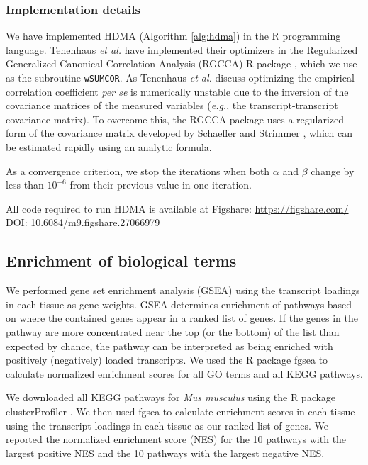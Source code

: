 \documentclass[
]{article}
\begin{document}
\subsubsection{Implementation details}\label{implementation-details}

We have implemented HDMA (Algorithm \ref{alg:hdma}) in the R programming
language. Tenenhaus \textit{et al.} have implemented their optimizers in
the Regularized Generalized Canonical Correlation Analysis (RGCCA) R
package \cite{girka2023multiblock}, which we use as the subroutine
\texttt{wSUMCOR}. As Tenenhaus \textit{et al.} discuss optimizing the
empirical correlation coefficient \textit{per se} is numerically
unstable due to the inversion of the covariance matrices of the measured
variables (\textit{e.g.}, the transcript-transcript covariance matrix).
To overcome this, the RGCCA package uses a regularized form of the
covariance matrix developed by Schaeffer and Strimmer
\cite{schafer2005shrinkage}, which can be estimated rapidly using an
analytic formula.

As a convergence criterion, we stop the iterations when both \(\alpha\)
and \(\beta\) change by less than \(10^{-6}\) from their previous value
in one iteration.

All code required to run HDMA is available at Figshare:
\url{https://figshare.com/} DOI: 10.6084/m9.figshare.27066979

\subsection{Enrichment of biological
terms}\label{enrichment-of-biological-terms}

We performed gene set enrichment analysis (GSEA) \cite{pmid16199517}
using the transcript loadings in each tissue as gene weights. GSEA
determines enrichment of pathways based on where the contained genes
appear in a ranked list of genes. If the genes in the pathway are more
concentrated near the top (or the bottom) of the list than expected by
chance, the pathway can be interpreted as being enriched with positively
(negatively) loaded transcripts. We used the R package fgsea
\cite{fgsea} to calculate normalized enrichment scores for all GO terms
and all KEGG pathways.

We downloaded all KEGG \cite{pmid36300620} pathways for
\textit{Mus musculus} using the R package clusterProfiler
\cite{pmid36300620}. We then used fgsea to calculate enrichment scores
in each tissue using the transcript loadings in each tissue as our
ranked list of genes. We reported the normalized enrichment score (NES)
for the 10 pathways with the largest positive NES and the 10 pathways
with the largest negative NES.
\end{document}
